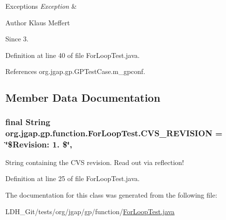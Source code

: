 \begin{DoxyExceptions}{Exceptions}
{\em Exception} & \\
\hline
\end{DoxyExceptions}
\begin{DoxyAuthor}{Author}
Klaus Meffert 
\end{DoxyAuthor}
\begin{DoxySince}{Since}
3. 
\end{DoxySince}


Definition at line 40 of file For\-Loop\-Test.\-java.



References org.\-jgap.\-gp.\-G\-P\-Test\-Case.\-m\-\_\-gpconf.



\subsection{Member Data Documentation}
\hypertarget{classorg_1_1jgap_1_1gp_1_1function_1_1_for_loop_test_ad665a54d045a8925858ecee0d2489d4a}{
\subsubsection[{C\-V\-S\-\_\-\-R\-E\-V\-I\-S\-I\-O\-N}]{\setlength{\rightskip}{0pt plus 5cm}final String org.\-jgap.\-gp.\-function.\-For\-Loop\-Test.\-C\-V\-S\-\_\-\-R\-E\-V\-I\-S\-I\-O\-N = \char`\"{}\$Revision\-: 1. \$\char`\"{}\hspace{0.3cm}{\ttfamily [static]}, {\ttfamily [private]}}}\label{classorg_1_1jgap_1_1gp_1_1function_1_1_for_loop_test_ad665a54d045a8925858ecee0d2489d4a}
String containing the C\-V\-S revision. Read out via reflection! 

Definition at line 25 of file For\-Loop\-Test.\-java.



The documentation for this class was generated from the following file\-:\begin{DoxyCompactItemize}
\item 
L\-D\-H\-\_\-\-Git/tests/org/jgap/gp/function/\hyperlink{_for_loop_test_8java}{For\-Loop\-Test.\-java}\end{DoxyCompactItemize}
